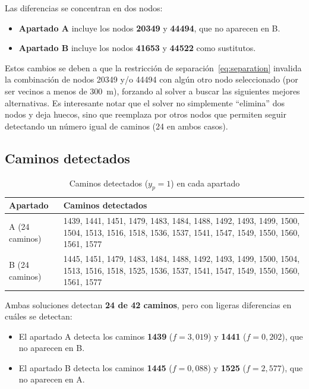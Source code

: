 \documentclass[12pt,a4paper]{article}
\begin{document}
Las diferencias se concentran en dos nodos:

\begin{itemize}[itemsep=4pt]
    \item \textbf{Apartado A} incluye los nodos \textbf{20349} y \textbf{44494}, que no aparecen en B.
    \item \textbf{Apartado B} incluye los nodos \textbf{41653} y \textbf{44522} como sustitutos.
\end{itemize}

Estos cambios se deben a que la restricción de separación~\eqref{eq:separation} invalida la combinación de nodos 20349 y/o 44494 con algún otro nodo seleccionado (por ser vecinos a menos de 300~m), forzando al solver a buscar las siguientes mejores alternativas. Es interesante notar que el solver no simplemente ``elimina'' dos nodos y deja huecos, sino que reemplaza por otros nodos que permiten seguir detectando un número igual de caminos (24 en ambos casos).

\subsection{Caminos detectados}

\begin{table}[H]
\centering
\caption{Caminos detectados ($y_p = 1$) en cada apartado}
\begin{tabular}{>{\raggedright\arraybackslash}p{2.5cm} p{10cm}}
\toprule
\textbf{Apartado} & \textbf{Caminos detectados} \\
\midrule
A (24 caminos) & 1439, 1441, 1451, 1479, 1483, 1484, 1488, 1492, 1493, 1499, 1500, 1504, 1513, 1516, 1518, 1536, 1537, 1541, 1547, 1549, 1550, 1560, 1561, 1577 \\[4pt]
B (24 caminos) & 1445, 1451, 1479, 1483, 1484, 1488, 1492, 1493, 1499, 1500, 1504, 1513, 1516, 1518, 1525, 1536, 1537, 1541, 1547, 1549, 1550, 1560, 1561, 1577 \\
\bottomrule
\end{tabular}
\end{table}

Ambas soluciones detectan \textbf{24 de 42 caminos}, pero con ligeras diferencias en cuáles se detectan:
\begin{itemize}
    \item El apartado A detecta los caminos \textbf{1439} ($f = 3{,}019$) y \textbf{1441} ($f = 0{,}202$), que no aparecen en B.
    \item El apartado B detecta los caminos \textbf{1445} ($f = 0{,}088$) y \textbf{1525} ($f = 2{,}577$), que no aparecen en A.
\end{itemize}
\end{document}
